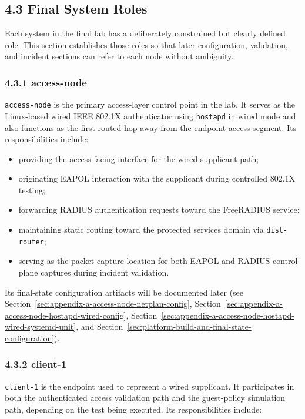\documentclass[11pt]{article}
\begin{document}
\subsection{4.3 Final System Roles}
\label{sec:final-system-roles}

Each system in the final lab has a deliberately constrained but clearly defined role. This section establishes those roles so that later configuration, validation, and incident sections can refer to each node without ambiguity.

\subsubsection{4.3.1 access-node}
\label{sec:access-node-role}

\texttt{access-node} is the primary access-layer control point in the lab. It serves as the Linux-based wired IEEE 802.1X authenticator using \texttt{hostapd} in wired mode and also functions as the first routed hop away from the endpoint access segment. Its responsibilities include:

\begin{itemize}
    \item providing the access-facing interface for the wired supplicant path;
    \item originating EAPOL interaction with the supplicant during controlled 802.1X testing;
    \item forwarding RADIUS authentication requests toward the FreeRADIUS service;
    \item maintaining static routing toward the protected services domain via \texttt{dist-router};
    \item serving as the packet capture location for both EAPOL and RADIUS control-plane captures during incident validation.
\end{itemize}

Its final-state configuration artifacts will be documented later (see Section~\ref{sec:appendix-a-access-node-netplan-config}, Section~\ref{sec:appendix-a-access-node-hostapd-wired-config}, Section~\ref{sec:appendix-a-access-node-hostapd-wired-systemd-unit}, and Section~\ref{sec:platform-build-and-final-state-configuration}).

\subsubsection{4.3.2 client-1}
\label{sec:client-1-role}

\texttt{client-1} is the endpoint used to represent a wired supplicant. It participates in both the authenticated access validation path and the guest-policy simulation path, depending on the test being executed. Its responsibilities include:
\end{document}
